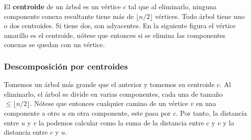 El \textbf{centroide} de un árbol es un vértice $c$ tal que al eliminarlo, ninguna componente conexa resultante tiene más de $\lfloor n/2 \rfloor$ vértices. Todo árbol tiene uno o dos centroides. Si tiene dos, son adyacentes. En la siguiente figura el vértice amarillo es el centroide, nótese que entonces si se elimina las componentes conexas se quedan con un vértice.
 
\begin{figure}[H]
\centering
{}
\end{figure}
 
\subsubsection*{Descomposición por centroides}

Tomemos un árbol más grande que el anterior y tomemos su centroide $c$. Al eliminarlo, el árbol se divide en varias componentes, cada una de tamaño $\leq \lfloor n/2 \rfloor$. Nótese que entonces cualquier camino de un vértice $v$ en una componente a otro $u$ en otra componente, este pasa por $c$. Por tanto, la distancia entre $u$ y $v$ la podemos calcular como la suma de la distancia entre $c$ y $v$ y la distancia entre $c$ y $u$.

